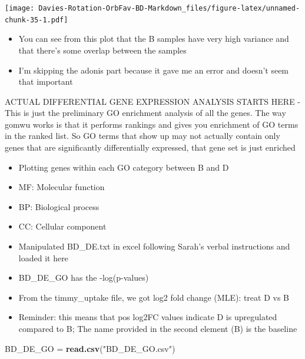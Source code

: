 \documentclass[
]{article}
\newenvironment{Shaded}{\begin{snugshade}}{\end{snugshade}}
\newcommand{\KeywordTok}[1]{\textcolor[rgb]{0.13,0.29,0.53}{\textbf{#1}}}
\newcommand{\NormalTok}[1]{#1}
\newcommand{\StringTok}[1]{\textcolor[rgb]{0.31,0.60,0.02}{#1}}
\begin{document}
\texttt{[image: Davies-Rotation-OrbFav-BD-Markdown\_files/figure-latex/unnamed-chunk-35-1.pdf]}

\begin{itemize}
\item
  You can see from this plot that the B samples have very high variance
  and that there's some overlap between the samples
\item
  I'm skipping the adonis part because it gave me an error and doesn't
  seem that important
\end{itemize}

ACTUAL DIFFERENTIAL GENE EXPRESSION ANALYSIS STARTS HERE - This is just
the preliminary GO enrichment analysis of all the genes. The way gomwu
works is that it performs rankings and gives you enrichment of GO terms
in the ranked list. So GO terms that show up may not actually contain
only genes that are significantly differentially expressed, that gene
set is just enriched

\begin{itemize}
\item
  Plotting genes within each GO category between B and D
\item
  MF: Molecular function
\item
  BP: Biological process
\item
  CC: Cellular component
\item
  Manipulated BD\_DE.txt in excel following Sarah's verbal instructions
  and loaded it here
\item
  BD\_DE\_GO has the -log(p-values)
\item
  From the timmy\_uptake file, we got log2 fold change (MLE): treat D vs
  B
\item
  Reminder: this means that pos log2FC values indicate D is upregulated
  compared to B; The name provided in the second element (B) is the
  baseline
\end{itemize}

\begin{Shaded}
\begin{Highlighting}[]
\NormalTok{BD_DE_GO =}\StringTok{ }\KeywordTok{read.csv}\NormalTok{(}\StringTok{"BD_DE_GO.csv"}\NormalTok{)}
\end{Highlighting}
\end{Shaded}
\end{document}
